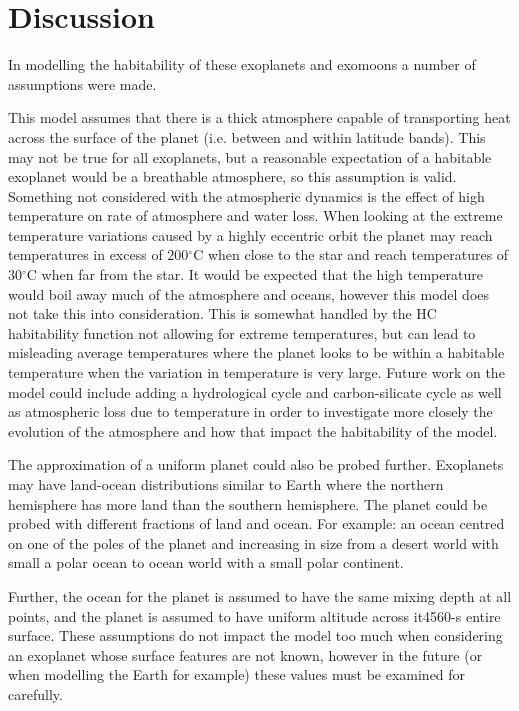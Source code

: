 \documentclass[12pt, onecolumn]{revtex4-2}    %
\newcommand{\degreesC}{\ensuremath{^{\circ}\text{C}}}
\begin{document}
\section{Discussion} \label{sec:Discussion}
In modelling the habitability of these exoplanets and exomoons a number of assumptions were made.

This model assumes that there is a thick atmosphere capable of transporting heat across the surface of the planet (i.e. between and within latitude bands).
This may not be true for all exoplanets, but a reasonable expectation of a habitable exoplanet would be a breathable atmosphere, so this assumption is valid.
Something not considered with the atmospheric dynamics is the effect of high temperature on rate of atmosphere and water loss.
When looking at the extreme temperature variations caused by a highly eccentric orbit the planet may reach temperatures in excess of $200\degreesC$ when close to the star and reach temperatures of $30\degreesC$ when far from the star.
It would be expected that the high temperature would boil away much of the atmosphere and oceans, however this model does not take this into consideration.
This is somewhat handled by the HC habitability function not allowing for extreme temperatures, but can lead to misleading average temperatures where the planet looks to be within a habitable temperature when the variation in temperature is very large.
Future work on the model could include adding a hydrological cycle and carbon-silicate cycle as well as atmospheric loss due to temperature in order to investigate more closely the evolution of the atmosphere and how that impact the habitability of the model.

The approximation of a uniform planet could also be probed further.
Exoplanets may have land-ocean distributions similar to Earth where the northern hemisphere has more land than the southern hemisphere.
The planet could be probed with different fractions of land and ocean.
For example: an ocean centred on one of the poles of the planet and increasing in size from a desert world with small a polar ocean to ocean world with a small polar continent.

Further, the ocean for the planet is assumed to have the same mixing depth at all points, and the planet is assumed to have uniform altitude across it4560-s entire surface.
These assumptions do not impact the model too much when considering an exoplanet whose surface features are not known, however in the future (or when modelling the Earth for example) these values must be examined for carefully.
\end{document}
